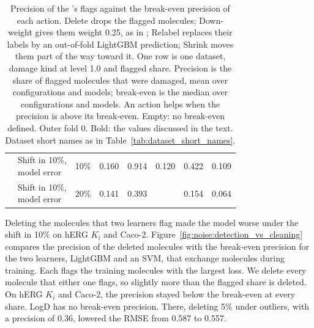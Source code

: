 \begin{table}[htbp]
\begin{tabular}{@{}llrrrrrr@{}}
 & \makecell[l]{Shift in 10\%,\\model error} &10\% & 0.160 & 0.914 & 0.120 & 0.422 & 0.109 \\
 & \makecell[l]{Shift in 10\%,\\model error} &20\% & 0.141 & 0.393 &  & 0.154 & 0.064 \\
\bottomrule
\end{tabular}
\caption[LightGBM residual precision against break-even precision.]{Precision of the 's flags against the break-even precision of each action. Delete drops the flagged molecules; Down-weight gives them weight 0.25, as in ; Relabel replaces their labels by an out-of-fold LightGBM prediction; Shrink moves them part of the way toward it. One row is one dataset, damage kind at level 1.0 and flagged share. Precision is the share of flagged molecules that were damaged, mean over configurations and models; break-even is the median over configurations and models. An action helps when the precision is above its break-even. Empty: no break-even defined. Outer fold 0. Bold: the values discussed in the text. Dataset short names as in Table~\ref{tab:dataset_short_names}.}
\label{tab:noise:res:breakeven}
\end{table}

Deleting the molecules that two learners flag made the model worse under the shift in 10\% on hERG $K_i$ and Caco-2. Figure~\ref{fig:noise:detection_vs_cleaning} compares the precision of the deleted molecules with the break-even precision for the two learners, LightGBM and an SVM, that exchange molecules during training. Each flags the training molecules with the largest loss. We delete every molecule that either one flags, so slightly more than the flagged share is deleted. On hERG $K_i$ and Caco-2, the precision stayed below the break-even at every share. LogD has no break-even precision. There, deleting 5\% under outliers, with a precision of 0.36, lowered the RMSE from 0.587 to 0.557.

